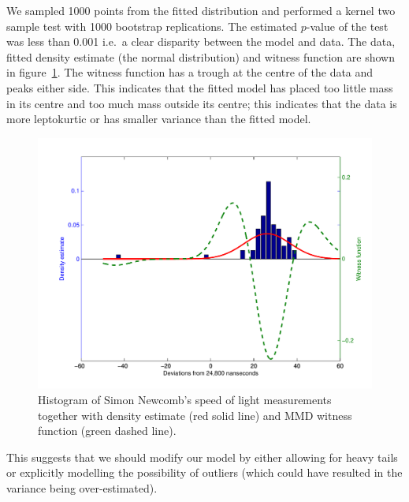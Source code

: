 \documentclass{article}
\def\ie{i.e.\ }
\begin{document}
We sampled 1000 points from the fitted distribution and performed a kernel two sample test with 1000 bootstrap replications.
The estimated $p$-value of the test was less than 0.001 \ie a clear disparity between the model and data.
The data, fitted density estimate (the normal distribution) and witness function are shown in figure~\ref{fig:newcomb_witness_1}.
The witness function has a trough at the centre of the data and peaks either side.
This indicates that the fitted model has placed too little mass in its centre and too much mass outside its centre; this indicates that the data is more leptokurtic or has smaller variance than the fitted model.

\begin{figure}[ht]
\centering
\includegraphics[width=0.98\columnwidth]{figures/newcomb_witness_1}
\caption{
Histogram of Simon Newcomb's speed of light measurements together with density estimate (red solid line) and MMD witness function (green dashed line).
}
\label{fig:newcomb_witness_1}
\end{figure}

This suggests that we should modify our model by either allowing for heavy tails or explicitly modelling the possibility of outliers (which could have resulted in the variance being over-estimated).
\end{document}
